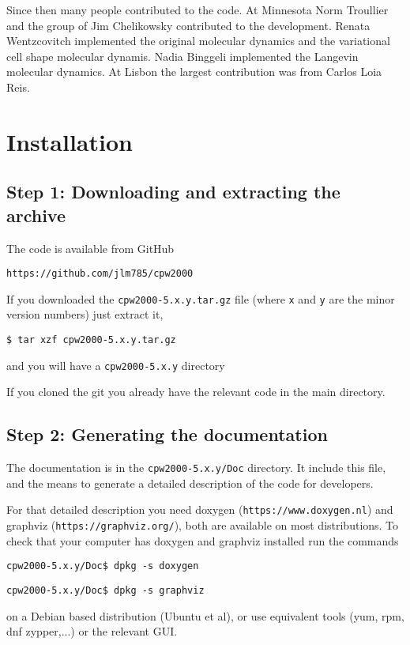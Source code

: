 \documentclass[11pt]{article}
\begin{document}
Since then many people contributed to the code.   At Minnesota Norm Troullier
and the group of Jim Chelikowsky contributed to the development.
Renata Wentzcovitch implemented the original molecular dynamics and the variational
cell shape molecular dynamis.  Nadia Binggeli implemented the Langevin molecular dynamics.
At Lisbon the largest contribution was from Carlos Loia Reis.

\section{Installation}
\label{sec:install}

\subsection{Step 1: Downloading and extracting the archive}
\label{sec:step1}

The code is available from GitHub

\noindent\texttt{https://github.com/jlm785/cpw2000}

If you downloaded the \texttt{cpw2000-5.x.y.tar.gz} file (where \texttt{x} and \texttt{y}
are the minor version numbers) just extract it,

\noindent\texttt{\$ tar xzf cpw2000-5.x.y.tar.gz}

and you will have a \texttt{cpw2000-5.x.y} directory

If you cloned the git you already have the relevant code in the main directory.

\subsection{Step 2: Generating the documentation}
\label{sec:step2}

The documentation is in the \texttt{cpw2000-5.x.y/Doc} directory.  It include this file, and the means to generate a detailed
description of the code for developers.

For that detailed description you need doxygen (\texttt{https://www.doxygen.nl}) and
graphviz (\texttt{https://graphviz.org/}), both are
available on most distributions.  To check that your computer has doxygen and graphviz installed
run the commands

\noindent\texttt{cpw2000-5.x.y/Doc\$ dpkg -s doxygen}

\noindent\texttt{cpw2000-5.x.y/Doc\$ dpkg -s graphviz}

on a Debian based distribution (Ubuntu et al), or use equivalent tools (yum, rpm, dnf zypper,...) or the relevant GUI.
\end{document}
